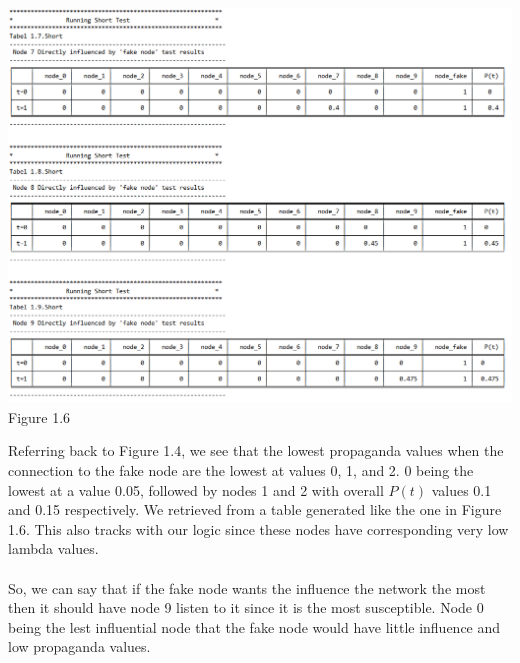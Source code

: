 \documentclass[letterpaper]{article}
\begin{document}
\begin{center}
	\includegraphics[scale=0.7]{./Images/Figure1.6} \\
	Figure 1.6
\end{center}
Referring back to Figure 1.4, we see that the lowest propaganda values when the connection to the fake node are the lowest at values 0, 1, and 2.  0 being the lowest at a value 0.05, followed by nodes 1 and 2 with overall $P(t)$ values 0.1 and 0.15 respectively.  We retrieved from a table generated like the one in Figure 1.6.  This also tracks with our logic since these nodes have corresponding very low lambda values.\\\\
So, we can say that if the fake node wants the influence the network the most then it should have node 9 listen to it since it is the most susceptible.  Node 0 being the lest influential node that the fake node would have little influence and low propaganda values.\\\\

\end{document}
